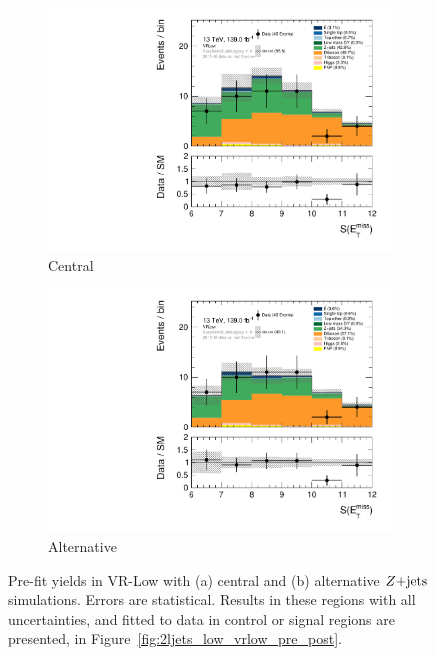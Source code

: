 \begin{figure}[tp]
\centering
\begin{subfigure}{0.48\textwidth}
\centering
\includegraphics[width=\textwidth]{figures/2ljets_vrlow_met_Sign_VRLow.pdf}
\caption{Central}
\end{subfigure}
\hfill
\begin{subfigure}{0.48\textwidth}
\centering
\includegraphics[width=\textwidth]{figures/2ljets_vrlow_met_Sign_VRLow_mg5.pdf}
\caption{Alternative}
\end{subfigure}
\caption[
Pre-fit yields in VR-Low with central and alternative $\zjets$ simulations
]{%
Pre-fit yields in VR-Low with (a) central and (b) alternative $\zjets$
simulations.
Errors are statistical.
Results in these regions with all uncertainties, and fitted to data in
control or signal regions are presented, in
Figure~\ref{fig:2ljets_low_vrlow_pre_post}.
}
\label{fig:2ljets_vrlow_alt}
\end{figure}

